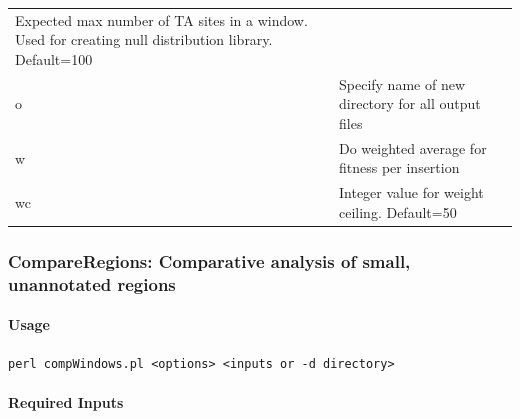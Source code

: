 \documentclass[11pt,]{article}
\let\oldparagraph\paragraph
\renewcommand{\paragraph}[1]{\oldparagraph{#1}\mbox{}}
\begin{document}
\begin{longtable}[]{@{}ll@{}}
\begin{minipage}[t]{0.88\columnwidth}
Expected max number of TA sites in a window. Used for creating null
distribution library. Default=100\strut
\end{minipage}\tabularnewline
\begin{minipage}[t]{0.06\columnwidth}\raggedright\strut
o\strut
\end{minipage} & \begin{minipage}[t]{0.88\columnwidth}\raggedright\strut
Specify name of new directory for all output files\strut
\end{minipage}\tabularnewline
\begin{minipage}[t]{0.06\columnwidth}\raggedright\strut
w\strut
\end{minipage} & \begin{minipage}[t]{0.88\columnwidth}\raggedright\strut
Do weighted average for fitness per insertion\strut
\end{minipage}\tabularnewline
\begin{minipage}[t]{0.06\columnwidth}\raggedright\strut
wc\strut
\end{minipage} & \begin{minipage}[t]{0.88\columnwidth}\raggedright\strut
Integer value for weight ceiling. Default=50\strut
\end{minipage}\tabularnewline
\bottomrule
\end{longtable}

\subsubsection{CompareRegions: Comparative analysis of small,
unannotated
regions}\label{compareregions-comparative-analysis-of-small-unannotated-regions-1}

\paragraph{Usage}\label{usage-6}

\begin{verbatim}
perl compWindows.pl <options> <inputs or -d directory>
\end{verbatim}

\paragraph{Required Inputs}\label{required-inputs-6}
\end{document}
